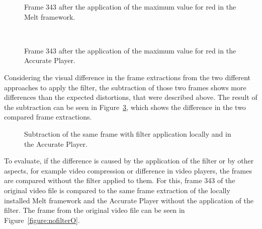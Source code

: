 \documentclass[../MasterThesis.tex]{subfiles}
\begin{document}
\begin{minipage}{0.48\textwidth}
	
	\begin{figure}[H]
		\begin{center}
			\caption[Frame 343 after the application of the red filter in the Melt framework.]{Frame 343 after the application of the maximum value for red in the Melt framework.}
			\label{figure:redMelt}
		\end{center}
	\end{figure}
\end{minipage}\begin{minipage}{0.04\textwidth}
	\ 
\end{minipage}\begin{minipage}{0.48\textwidth}
	
	\begin{figure}[H]
		\begin{center}
			\caption[Frame 343 after the application of the red filter in the Accurate Player.]{Frame 343 after the application of the maximum value for red in the Accurate Player.}
			\label{figure:redAP}
		\end{center}
	\end{figure}
\end{minipage}

\vspace*{2em}
Considering the visual difference in the frame extractions from the two different approaches to apply the filter, the subtraction of those two frames shows more differences than the expected distortions, that were described above. The result of the subtraction can be seen in Figure~\ref{figure:filterVSfilter}, which shows the difference in the two compared frame extractions.


\begin{figure}[H]
	\begin{center}
		\caption[Subtraction of the two different frames (Melt and Accurate Player).]{Subtraction of the same frame with filter application locally and in the Accurate Player.}
		\label{figure:filterVSfilter}
	\end{center}
\end{figure}

To evaluate, if the difference is caused by the application of the filter or by other aspects, for example video compression or difference in video players, the frames are compared without the filter applied to them. For this, frame 343 of the original video file is compared to the same frame extraction of the locally installed Melt framework and the Accurate Player without the application of the filter. The frame from the original video file can be seen in Figure~\ref{figure:nofilterO}.
\end{document}
